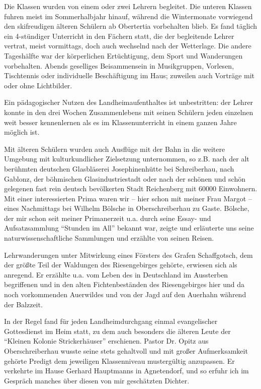 \documentclass[a5paper,pagesize,10pt,twoside=true]{scrbook}
\renewcommand{\marginpar}[2][]{}
\begin{document}
Die Klassen wurden von einem oder zwei Lehrern begleitet. Die unteren Klassen fuhren meist im Sommerhalbjahr hinauf, während die Wintermonate vorwiegend den skifreudigen älteren Schülern ab Obertertia vorbehalten blieb. Es fand täglich ein 4-stündiger Unterricht in den Fächern statt, die der begleitende Lehrer vertrat, meist vormittags, doch auch wechselnd nach der Wetterlage. Die andere Tageshälfte war der körperlichen Ertüchtigung, dem Sport und Wanderungen vorbehalten. Abends geselliges Beisammensein in Musikgruppen, Vorlesen, Tischtennis oder individuelle Beschäftigung im Haus; zuweilen auch Vorträge mit oder ohne Lichtbilder.

Ein pädagogischer Nutzen des Landheimaufenthaltes ist unbestritten: der Lehrer konnte in den drei Wochen Zusammenlebens mit seinen Schülern jeden einzelnen weit besser kennenlernen als es im Klassenunterricht in einem ganzen Jahre möglich ist.

Mit älteren Schülern wurden auch Ausflüge mit der Bahn in die weitere Umgebung mit kulturkundlicher Zielsetzung unternommen, so z.B. nach der alt berühmten deutschen Glasbläserei Josephinenhütte bei Schreiberhau, nach Gablonz, der böhmischen Glasindustriestadt oder nach der schönen und schön gelegenen fast rein deutsch bevölkerten Stadt Reichenberg mit \num{60000} Einwohnern. Mit einer interessierten Prima waren wir -- hier schon mit meiner Frau Margot -- eines Nachmittags bei Wilhelm Bölsche in Oberschreiberhau zu Gaste. Bölsche, der mir schon seit meiner Primanerzeit u.a. durch seine Essay- und Aufsatzsammlung \enquote{Stunden im All} bekannt war, zeigte und erläuterte uns seine naturwissenschaftliche Sammlungen und erzählte von seinen Reisen.

Lehrwanderungen unter Mitwirkung eines Försters des Grafen Schaffgotsch, dem der größte Teil der Waldungen des Riesengebirges gehörte, erwiesen sich als anregend. Er erzählte u.a. vom Leben des in Deutschland im Aussterben begriffenen und in den alten Fichtenbeständen des Riesengebirges hier und da noch vorkommenden Auerwildes und von der Jagd auf den Auerhahn während der Balzzeit.

\marginpar{556}
In der Regel fand für jeden Landheimdurchgang einmal evangelischer Gottesdienst im Heim statt, zu dem auch besonders die älteren Leute der \enquote{Kleinen Kolonie Strickerhäuser} erschienen. Pastor Dr. Opitz aus Oberschreiberhau wusste seine stets gehaltvoll und mit großer Aufmerksamkeit gehörte Predigt dem jeweiligen Klassenniveau mustergültig anzupassen. Er verkehrte im Hause Gerhard Hauptmanns in Agnetendorf, und so erfuhr ich im Gespräch manches über diesen von mir geschätzten Dichter.
\end{document}
